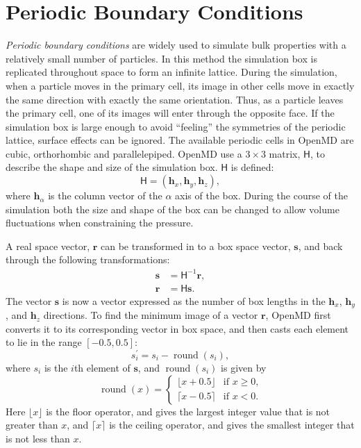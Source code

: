 \documentclass[letterpaper]{report}
\begin{document}
\section{\label{section:pbc}Periodic Boundary Conditions} 

\newcommand{\roundme}{\operatorname{round}}

\textit{Periodic boundary conditions} are widely used to simulate bulk
properties with a relatively small number of particles. In this method
the simulation box is replicated throughout space to form an infinite
lattice.  During the simulation, when a particle moves in the primary
cell, its image in other cells move in exactly the same direction with
exactly the same orientation. Thus, as a particle leaves the primary
cell, one of its images will enter through the opposite face. If the
simulation box is large enough to avoid ``feeling'' the symmetries of
the periodic lattice, surface effects can be ignored. The available
periodic cells in OpenMD are cubic, orthorhombic and
parallelepiped.  OpenMD use a $3 \times 3$ matrix, $\mathsf{H}$,
to describe the shape and size of the simulation box. $\mathsf{H}$ is
defined:
\begin{equation}
\mathsf{H} = ( \mathbf{h}_x, \mathbf{h}_y, \mathbf{h}_z ),
\end{equation}
where $\mathbf{h}_{\alpha}$ is the column vector of the $\alpha$ axis of the
box.  During the course of the simulation both the size and shape of
the box can be changed to allow volume fluctuations when constraining
the pressure.

A real space vector, $\mathbf{r}$ can be transformed in to a box space
vector, $\mathbf{s}$, and back through the following transformations:
\begin{align}
\mathbf{s} &= \mathsf{H}^{-1} \mathbf{r}, \\
\mathbf{r} &= \mathsf{H} \mathbf{s}.
\end{align}
The vector $\mathbf{s}$ is now a vector expressed as the number of box
lengths in the $\mathbf{h}_x$, $\mathbf{h}_y$, and $\mathbf{h}_z$
directions. To find the minimum image of a vector $\mathbf{r}$,
OpenMD first converts it to its corresponding vector in box space, and
then casts each element to lie in the range $[-0.5,0.5]$:
\begin{equation}
s_{i}^{\prime}=s_{i}-\roundme(s_{i}),
\end{equation}
where $s_i$ is the $i$th element of $\mathbf{s}$, and
$\roundme(s_i)$ is given by
\begin{equation}
\roundme(x) =
	\begin{cases}
	\lfloor x+0.5 \rfloor & \text{if $x \ge 0$,} \\
	\lceil x-0.5 \rceil & \text{if $x < 0$.}
	\end{cases}
\end{equation}
Here $\lfloor x \rfloor$ is the floor operator, and gives the largest
integer value that is not greater than $x$, and $\lceil x \rceil$ is
the ceiling operator, and gives the smallest integer that is not less
than $x$. 
\end{document}
